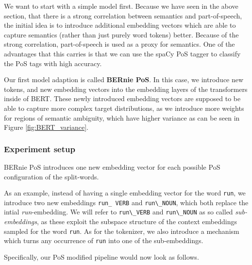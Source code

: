 \documentclass[a4paper,12pt,twoside,openright]{report}
\begin{document}
We want to start with a simple model first.
Because we have seen in the above section, that there is a strong correlation between semantics and part-of-speech, the initial idea is to introduce additional embedding vectors which are able to capture semantics (rather than just purely word tokens) better.
Because of the strong correlation, part-of-speech is used as a proxy for semantics.
One of the advantages that this carries is that we can use the spaCy PoS tagger \cite{spacyb} to classify the PoS tags with high accuracy.

Our first model adaption is called \textbf{BERnie PoS}.
In this case, we introduce new tokens, and new embedding vectors into the embedding layers of the transformers inside of BERT.
These newly introduced embedding vectors are supposed to  be able to capture more complex target distributions, as we introduce more weights for regions of semantic ambiguity, which have higher variance as can be seen in Figure \eqref{fig:BERT_variance}.

\subsubsection{Experiment setup}

BERnie PoS introduces one new embedding vector for each possible PoS configuration of the split-words.

As an example, instead of having a single embedding vector for the word \Verb#run#, we introduce two new embeddings \Verb#run_ VERB# and \Verb#run\_NOUN#, which both replace the intial \textit{run}-embedding. 
We will refer to \Verb#run\_VERB# and \Verb#run\_NOUN# as so called \textit{sub-embeddings}, as these exploit the subspace structure of the context embeddings sampled for the word \Verb#run#.
As for the tokenizer, we also introduce a mechanism which turns any occurrence of \Verb#run# into one of the sub-embeddings.

Specifically, our PoS modified pipeline would now look as follows.
\end{document}
